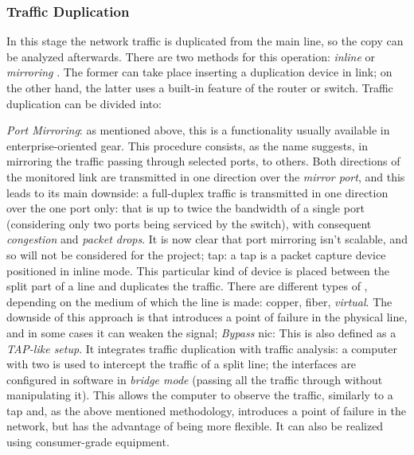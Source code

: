 \subsubsection{Traffic Duplication}
\label{subsubsec:traffic-duplication}

In this stage the network traffic is duplicated from the main line, so the copy can be analyzed afterwards. There are two methods for this operation: \textit{inline} or \textit{mirroring} \cite{Svoboda2015}. The former can take place inserting a duplication device in link; on the other hand, the latter uses a built-in feature of the router or switch. Traffic duplication can be divided into:
\begin{itemize}
    \itemAR \textit{Port Mirroring}: as mentioned above, this is a functionality usually available in enterprise-oriented gear. This procedure consists, as the name suggests, in mirroring the traffic passing through selected ports, to others. Both directions of the monitored link are transmitted in one direction over the \textit{mirror port}, and this leads to its main downside: a full-duplex traffic is transmitted in one direction over the one port only: that is up to twice the bandwidth of a single port (considering only two ports being serviced by the switch), with consequent \textit{congestion} and \textit{packet drops}. It is now clear that port mirroring isn't scalable, and so will not be considered for the project;
    \itemAR \gls{tap}: a \gls{tap} is a packet capture device positioned in inline mode. This particular kind of device is placed between the split part of a line and duplicates the traffic. There are different types of , depending on the medium of which the line is made: copper, fiber, \textit{virtual}. The downside of this approach is that introduces a point of failure in the physical line, and in some cases it can weaken the signal;
    \itemAR \textit{Bypass} \gls{nic}: This is also defined as a \textit{TAP-like setup}. It integrates traffic duplication with traffic analysis: a computer with two  is used to intercept the traffic of a split line; the interfaces are configured in software in \textit{bridge mode} (passing all the traffic through without manipulating it). This allows the computer to observe the traffic, similarly to a \gls{tap} and, as the above mentioned methodology, introduces a point of failure in the network, but has the advantage of being more flexible. It can also be realized using consumer-grade equipment.
\end{itemize}

